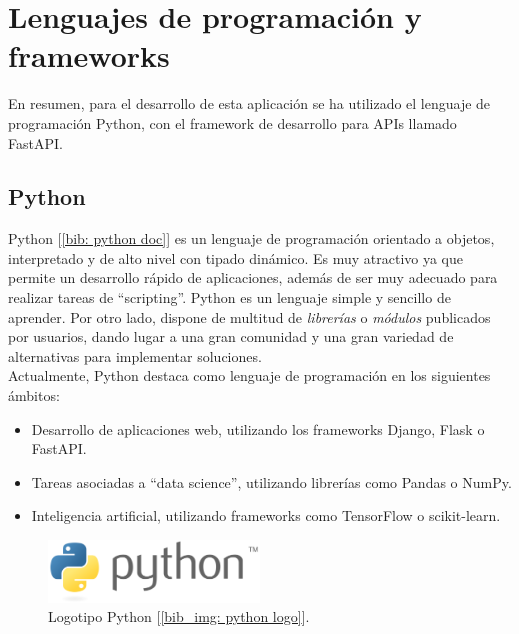 \documentclass[a4paper, oneside, 12pt]{book}
\begin{document}
	\pagebreak
	
	\section[Lenguajes y frameworks]{Lenguajes de programación y frameworks}
	
	\noindent En resumen, para el desarrollo de esta aplicación se ha utilizado el lenguaje de programación Python, con el framework de desarrollo para APIs llamado FastAPI.
	
	\subsection{Python}
	
	\noindent Python [\ref{bib: python doc}] es un lenguaje de programación orientado a objetos, interpretado y de alto nivel con tipado dinámico. Es muy atractivo ya que permite un desarrollo rápido de aplicaciones, además de ser muy adecuado para realizar tareas de ``scripting''. Python es un lenguaje simple y sencillo de aprender. Por otro lado, dispone de multitud de \textit{librerías} o \textit{módulos} publicados por usuarios, dando lugar a una gran comunidad y una gran variedad de alternativas para implementar soluciones. \\
	
	\noindent Actualmente, Python destaca como lenguaje de programación en los siguientes ámbitos:
	\begin{itemize}
		\item Desarrollo de aplicaciones web, utilizando los frameworks Django, Flask o FastAPI.
		\item Tareas asociadas a ``data science'', utilizando librerías como Pandas o NumPy.
		\item Inteligencia artificial, utilizando frameworks como TensorFlow o scikit-learn.
	\end{itemize}
	
	\begin{figure}[h!]
		\begin{center}
			\includegraphics[width=0.5\textwidth]{img/python_logo.png}
			\caption{Logotipo Python [\ref{bib_img: python logo}].}
			\label{img: python logo}
		\end{center}
	\end{figure}
	
\end{document}

